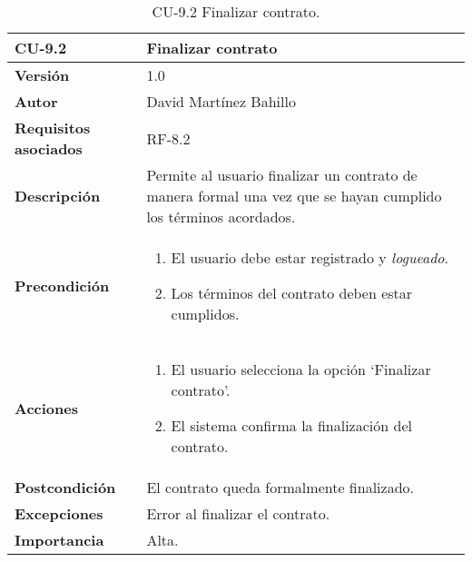 \begin{table}[p]
	\centering
	\begin{tabularx}{\linewidth}{ p{} p{} }
		\toprule
		\textbf{CU-9.2}  & \textbf{Finalizar contrato}\\
		\midrule
		\textbf{Versión}              & 1.0    \\
		\textbf{Autor}                & David Martínez Bahillo \\
		\textbf{Requisitos asociados} & RF-8.2 \\
		\textbf{Descripción}          & Permite al usuario finalizar un contrato de manera formal una vez que se hayan cumplido los términos acordados. \\
		\textbf{Precondición}         &  
		\begin{enumerate}
			\item El usuario debe estar registrado y \textit{logueado}.
			\item Los términos del contrato deben estar cumplidos.
		\end{enumerate}\\
		\textbf{Acciones}             &
		\begin{enumerate}
			\item El usuario selecciona la opción `Finalizar contrato'.
			\item El sistema confirma la finalización del contrato.
		\end{enumerate}\\
		\textbf{Postcondición}        & El contrato queda formalmente finalizado. \\
		\textbf{Excepciones}          & Error al finalizar el contrato. \\
		\textbf{Importancia}          & Alta. \\
		\bottomrule
	\end{tabularx}
	\caption{CU-9.2 Finalizar contrato.}
\end{table}


